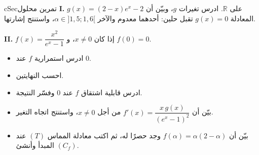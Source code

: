 \documentclass[12pt,a4paper]{article}
\newenvironment{BOX}[2]{\begin{otherlanguage}{english}\begin{arbox}{#1}{#2}}{\end{arbox}\end{otherlanguage}}
\newcounter{exo}
\newcommand{\R}{\mathbb{R}}
\newenvironment{sq}{\begin{itemize}[leftmargin=2.4em,itemsep=3pt]}{\end{itemize}}
\newcommand{\qa}{\item[(أ)]}\newcommand{\qb}{\item[(ب)]}\newcommand{\qc}{\item[(جـ)]}\newcommand{\qd}{\item[(د)]}\newcommand{\qe}{\item[(هـ)]}
\newenvironment{tmr}{\stepcounter{exo}\begin{BOX}{cSec}{تمرين محلول \theexo}}{\end{BOX}}
\let\origNeedspace\Needspace
\renewcommand{\Needspace}[1]{\origNeedspace{14\baselineskip}}
\begin{document}
\origNeedspace{20\baselineskip}
\begin{tmr}
\textbf{I.} $g(x)=(2-x)e^{x}-2$ على $\R$. ادرس تغيرات $g$، وبيّن أن المعادلة $g(x)=0$ تقبل حلين: أحدهما معدوم والآخر $\alpha\in]1{,}5;1{,}6[$، واستنتج إشارتها.\par
\textbf{II.} $f(x)=\dfrac{x^{2}}{e^{x}-1}$ إذا كان $x\neq0$، و $f(0)=0$.
\begin{sq}
\qa ادرس استمرارية $f$ عند $0$.
\qb احسب النهايتين.
\qc ادرس قابلية اشتقاق $f$ عند $0$ وفسّر النتيجة.
\qd بيّن أن $f'(x)=\dfrac{x\,g(x)}{\left(e^{x}-1\right)^{2}}$ من أجل $x\neq0$، واستنتج اتجاه التغير.
\qe بيّن أن $f(\alpha)=\alpha(2-\alpha)$ وجد حصرًا له، ثم اكتب معادلة المماس $(T)$ عند المبدأ وأنشئ $(C_f)$.
\end{sq}
\end{tmr}
\end{document}
